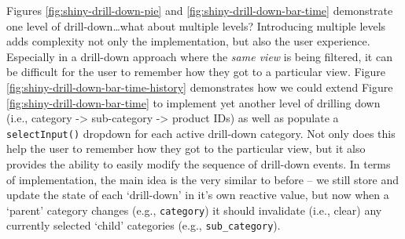 \documentclass[
  12pt,
]{krantz}
\begin{document}
Figures \ref{fig:shiny-drill-down-pie} and \ref{fig:shiny-drill-down-bar-time} demonstrate one level of drill-down\ldots what about multiple levels? Introducing multiple levels adds complexity not only the implementation, but also the user experience. Especially in a drill-down approach where the \emph{same view} is being filtered, it can be difficult for the user to remember how they got to a particular view. Figure \ref{fig:shiny-drill-down-bar-time-history} demonstrates how we could extend Figure \ref{fig:shiny-drill-down-bar-time} to implement yet another level of drilling down (i.e., category -\textgreater{} sub-category -\textgreater{} product IDs) as well as populate a \texttt{selectInput()} dropdown for each active drill-down category. Not only does this help the user to remember how they got to the particular view, but it also provides the ability to easily modify the sequence of drill-down events. In terms of implementation, the main idea is the very similar to before -- we still store and update the state of each `drill-down' in it's own reactive value, but now when a `parent' category changes (e.g., \texttt{category}) it should invalidate (i.e., clear) any currently selected `child' categories (e.g., \texttt{sub\_category}).

\end{document}

